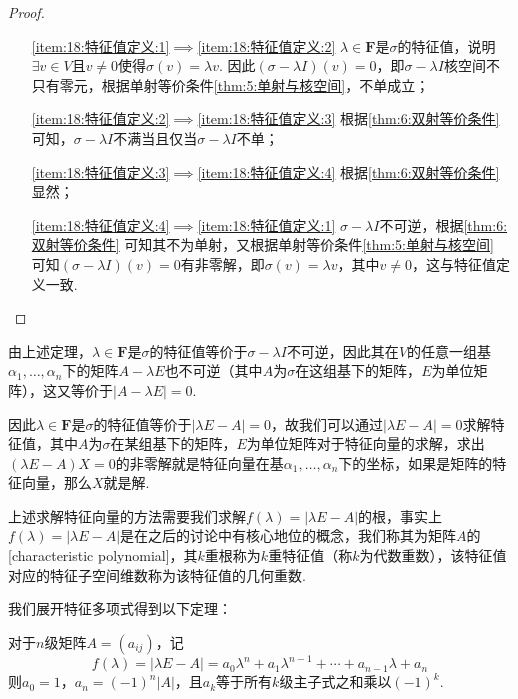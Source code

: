\begin{proof}
    \begin{itemize}[leftmargin=.8in] %
        \item[\ref*{item:18:特征值定义:1}$\implies$\ref*{item:18:特征值定义:2}] $\lambda\in\mathbf{F}$是$\sigma$的特征值，说明$\exists v\in V$且$v\neq 0$使得$\sigma(v)=\lambda v$. 因此$(\sigma-\lambda I)(v)=0$，即$\sigma-\lambda I$核空间不只有零元，根据单射等价条件\autoref{thm:5:单射与核空间}，不单成立；

        \item[\ref*{item:18:特征值定义:2}$\implies$\ref*{item:18:特征值定义:3}] 根据\autoref{thm:6:双射等价条件} 可知，$\sigma-\lambda I$不满当且仅当$\sigma-\lambda I$不单；

        \item[\ref*{item:18:特征值定义:3}$\implies$\ref*{item:18:特征值定义:4}] 根据\autoref*{thm:6:双射等价条件} 显然；

        \item[\ref*{item:18:特征值定义:4}$\implies$\ref*{item:18:特征值定义:1}] $\sigma-\lambda I$不可逆，根据\autoref*{thm:6:双射等价条件} 可知其不为单射，又根据单射等价条件\autoref*{thm:5:单射与核空间} 可知$(\sigma-\lambda I)(v)=0$有非零解，即$\sigma(v)=\lambda v$，其中$v\neq 0$，这与特征值定义一致.
    \end{itemize}
\end{proof}

由上述定理，$\lambda\in\mathbf{F}$是$\sigma$的特征值等价于$\sigma-\lambda I$不可逆，因此其在$V$的任意一组基$\alpha_1,\ldots,\alpha_n$下的矩阵$A-\lambda E$也不可逆（其中$A$为$\sigma$在这组基下的矩阵，$E$为单位矩阵），这又等价于$|A-\lambda E|=0$.

因此$\lambda\in\mathbf{F}$是$\sigma$的特征值等价于$|\lambda E-A|=0$，故我们可以通过$|\lambda E-A|=0$求解特征值，其中$A$为$\sigma$在某组基下的矩阵，$E$为单位矩阵对于特征向量的求解，求出$(\lambda E-A)X=0$的非零解就是特征向量在基$\alpha_1,\ldots,\alpha_n$下的坐标，如果是矩阵的特征向量，那么$X$就是解.

上述求解特征向量的方法需要我们求解$f(\lambda)=|\lambda E-A|$的根，事实上$f(\lambda)=|\lambda E-A|$是在之后的讨论中有核心地位的概念，我们称其为矩阵$A$的[characteristic polynomial]，其$k$重根称为$k$重特征值（称$k$为代数重数），该特征值对应的特征子空间维数称为该特征值的几何重数.

我们展开特征多项式得到以下定理：
\begin{theorem}\label{thm:18:特征多项式展开}
    对于$n$级矩阵$A=(a_{ij})$，记
    \[f(\lambda)=|\lambda E-A|=a_0\lambda^n+a_1\lambda^{n-1}+\cdots+a_{n-1}\lambda+a_n\]
    则$a_0=1$，$a_n=(-1)^n|A|$，且$a_k$等于所有$k$级主子式之和乘以$(-1)^k$.
\end{theorem}

